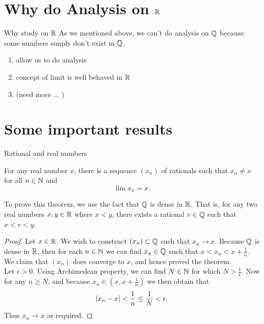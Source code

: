 \documentclass{beamer}
\begin{document}
\section{Why do Analysis on $\R$}
\begin{frame}{Why study on $\R$}
  As we mentioned above, we can't do analysis on $\Q$
  because some numbers simply don't exist in $\Q$.\\[0.3cm]
  \begin{enumerate}
    \item allow us to do analysis
    \item concept of limit is well behaved in $\R$
    \item (need more ... )
  \end{enumerate}
\end{frame}
\section{Some important results}
\begin{frame}{Rational and real numbers}
  \begin{theorem}
    For any real number $x$, there is a sequence $(x_n)$ 
    of rationals such that $x_n\neq x$ for all $n\in\N$
    and \[\lim x_n=x.\]
  \end{theorem}

  To prove this theorem, we use the fact that $\Q$ is
  dense in $\R$. That is, for any two real numbers $x,y\in\R$
  where $x<y$, there exists a rational $r\in\Q$ such that
  $x<r<y$.
\end{frame}

\begin{frame}[b]
  \begin{proof}
    Let $x\in\R$. We wish to construct $(x_n)\subset\Q$ 
    such that $x_n\to x$.
    Because $\Q$ is dense in $\R$, then for each $n\in\N$
    we can find $x_n\in\Q$ such that $x<x_n<x+\frac{1}{n}$.\\[0.3cm]
    We claim that $(x_n)$ does converge to $x$, and hence proved the
    theorem.\\[0.3cm]
    Let $\epsilon>0$. Using Archimedean property, we can find $N\in\N$
    for which $N>\frac{1}{\epsilon}$. Now for any $n\geq N$, and because
    $x_n\in (x,x+\frac{1}{n})$ we then obtain that
    \[
      \lvert x_n-x\rvert<\frac{1}{n}\leq\frac{1}{N}<\epsilon.
    \]
    Thus $x_n\to x$ as required.
  \end{proof}
\end{frame}


\end{document}
